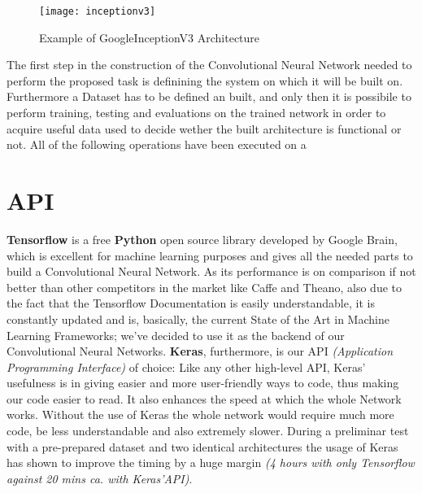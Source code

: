 \documentclass[../main.tex]{subfiles}
\begin{document}
\label{capitolo5}
\thispagestyle{empty}

\begin{figure}[b]
\caption{Example of GoogleInceptionV3 Architecture}
\centering
\texttt{[image: inceptionv3]}
\label{inceptionv3}
\end{figure}

The first step in the construction of the Convolutional Neural Network needed to perform the proposed task is definining the system on which it will be built on. Furthermore a Dataset has to be defined an built, and only then it is possibile to perform training, testing and evaluations on the trained network in order to acquire useful data used to decide wether the built architecture is functional or not. All of the following operations have been executed on a %

\section{API}
\textbf{Tensorflow} is a free \textbf{Python} open source library developed by Google Brain, which is excellent for machine learning purposes\cite{Tensorflow2017} and gives all the needed parts to build a Convolutional Neural Network. As its performance is on comparison if not better than other competitors in the market like Caffe and Theano, also due to the fact that the Tensorflow Documentation is easily understandable, it is constantly updated and is, basically, the current State of the Art in Machine Learning Frameworks; we've decided to use it as the backend of our Convolutional Neural Networks. \textbf{Keras}, furthermore, is our API \textit{(Application Programming Interface)} of choice: Like any other high-level API, Keras' usefulness is in giving easier and more user-friendly ways to code, thus making our code easier to read. It also enhances the speed at which the whole Network works. Without the use of Keras the whole network would require much more code, be less understandable and also extremely slower. During a preliminar test with a pre-prepared dataset and two identical architectures the usage of Keras has shown to improve the timing by a huge margin \textit{(4 hours with only Tensorflow against 20 mins ca. with Keras'API)}. 
\end{document}
